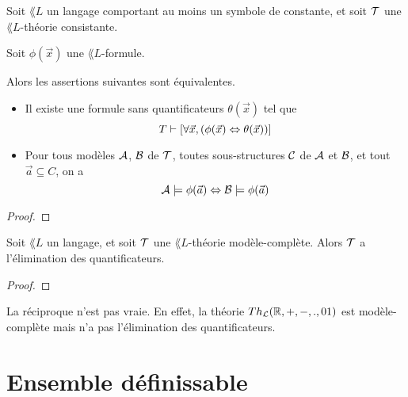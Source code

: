 \documentclass[a4paper, 12pt]{article}
\begin{document}
\begin{theorem}
	\label{theorem:critere_eq_formule_par_formule}
	Soit $\lang{L}$ un langage comportant au moins un symbole de constante, et
	soit $\mathcal{T}$ une $\lang{L}$-théorie consistante.

	Soit $\phi(\vec{x})$ une $\lang{L}$-formule.

	Alors les assertions suivantes sont équivalentes.

	\begin{itemize}
		\item Il existe une formule sans quantificateurs $\theta(\vec{x})$ tel
			que
			\begin{equation}
				T \vdash [\forall \vec{x}, (\phi(\vec{x}) \Leftrightarrow
				\theta(\vec{x}))]
			\end{equation}
		\item Pour tous modèles $\mathcal{A}$, $\mathcal{B}$ de $\mathcal{T}$,
			toutes sous-structures $\mathcal{C}$ de $\mathcal{A}$ et $\mathcal{B}$,
			et tout $\vec{a} \subseteq C$, on a
			\begin{equation}
				\mathcal{A} \models \phi(\vec{a}) \Leftrightarrow \mathcal{B} \models
				\phi(\vec{a})
			\end{equation}
	\end{itemize}
\end{theorem}

\begin{proof}

\end{proof}

\begin{proposition}
	Soit $\lang{L}$ un langage, et soit $\mathcal{T}$ une $\lang{L}$-théorie
	modèle-complète. Alors $\mathcal{T}$ a l'élimination des quantificateurs.
\end{proposition}

\begin{proof}

\end{proof}

\begin{remarque}
	La réciproque n'est pas vraie. En effet, la théorie $Th_{\mathcal{L}}(\mathbb{R}, +,
	-, ., 0 1)$ est modèle-complète mais n'a pas l'élimination des
	quantificateurs.
\end{remarque}

\section{Ensemble définissable}
\end{document}
